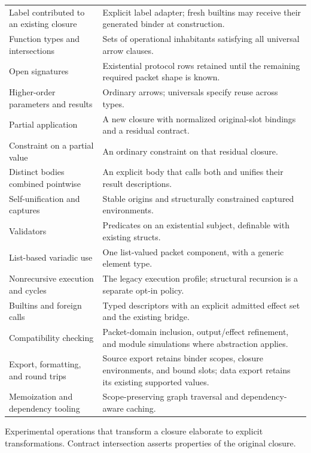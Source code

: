 \documentclass[11pt,a4paper,oneside]{report}
\theoremstyle{remark}
\begin{document}
\begin{longtable}{@{}P{.30\textwidth}P{.64\textwidth}@{}}
Label contributed to an existing closure & Explicit label adapter; fresh builtins may receive their generated binder at construction.\\
Function types and intersections & Sets of operational inhabitants satisfying all universal arrow clauses.\\
Open signatures & Existential protocol rows retained until the remaining required packet shape is known.\\
Higher-order parameters and results & Ordinary arrows; universals specify reuse across types.\\
Partial application & A new closure with normalized original-slot bindings and a residual contract.\\
Constraint on a partial value & An ordinary constraint on that residual closure.\\
Distinct bodies combined pointwise & An explicit body that calls both and unifies their result descriptions.\\
Self-unification and captures & Stable origins and structurally constrained captured environments.\\
Validators & Predicates on an existential subject, definable with existing structs.\\
List-based variadic use & One list-valued packet component, with a generic element type.\\
Nonrecursive execution and cycles & The legacy execution profile; structural recursion is a separate opt-in policy.\\
Builtins and foreign calls & Typed descriptors with an explicit admitted effect set and the existing bridge.\\
Compatibility checking & Packet-domain inclusion, output/effect refinement, and module simulations where abstraction applies.\\
Export, formatting, and round trips & Source export retains binder scopes, closure environments, and bound slots; data export retains its existing supported values.\\
Memoization and dependency tooling & Scope-preserving graph traversal and dependency-aware caching.\\
\bottomrule
\end{longtable}
\normalsize

Experimental operations that transform a closure elaborate to explicit
transformations. Contract intersection asserts properties of the original
closure.
\end{document}
